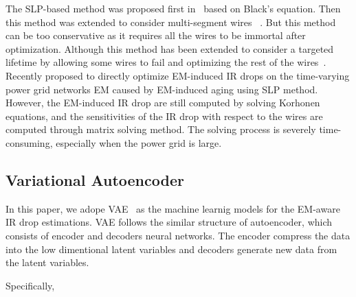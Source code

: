 The SLP-based method was proposed first in~\cite{Tan:DAC'99} based on Black's equation. Then this method was extended to consider multi-segment wires ~\cite{ZhouSun:ASPDAC'18}. But this method can be too conservative as it requires all the wires to be immortal after optimization. Although this method has been extended to consider a targeted lifetime by allowing some wires to fail and optimizing the rest of the wires~\cite{ZhouSun:TVLSI'19}.  Recently \cite{Sukharev:2019pg} proposed to directly optimize EM-induced IR drops on the time-varying power grid networks EM caused by EM-induced aging using SLP method. However, the EM-induced IR drop are still computed by solving Korhonen equations, and the sensitivities of the IR drop with respect to the wires are computed through matrix solving method.  
The solving process is severely time-consuming, especially when the power grid is large.





\subsection{Variational Autoencoder}
In this paper, we adope VAE~\cite{xxx} as the machine learnig models for the EM-aware IR drop estimations. VAE follows the similar structure of autoencoder, which consists of encoder and decoders neural networks. The encoder compress the data into the low dimentional latent variables and decoders generate  new data from the latent variables. 

Specifically, 